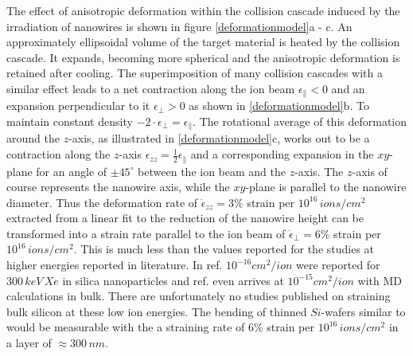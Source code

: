 \documentclass[12pt,
paper=a4,				
DIV=calc,		  %
BCOR=16mm,	  %
headinclude,
openany
]{scrbook}
\begin{document}
The effect of anisotropic deformation within the collision cascade induced by the irradiation of nanowires is shown in figure \ref{deformationmodel}a - c. An approximately ellipsoidal volume of the target material is heated by the collision cascade. It expands, becoming more spherical and the anisotropic deformation is retained after cooling. The superimposition of many collision cascades with a similar effect leads to a net contraction along the ion beam $\epsilon_{\parallel} < 0$ and an expansion perpendicular to it $\epsilon_{\perp} > 0$ as shown in \ref{deformationmodel}b. To maintain constant density $-2\cdot\epsilon_{\perp} =  \epsilon_{\parallel}$. The rotational average of this deformation around the $z$-axis, as illustrated in \ref{deformationmodel}c, works out to be a contraction along the $z$-axis $\epsilon_{zz} = \frac{1}{2} \epsilon_{\parallel}$ and a corresponding expansion in the $xy$-plane for an angle of $\pm 45^\circ$ between the ion beam and the $z$-axis. The $z$-axis of course represents the nanowire axis, while the $xy$-plane is parallel to the nanowire diameter. Thus the deformation rate of $\dot\epsilon_{zz} = 3\%$ strain per $10^{16}\,ions/cm^2$ extracted from a linear fit to the reduction of the nanowire height can be transformed into a strain rate parallel to the ion beam of $\dot\epsilon_{\perp} = 6\%$ strain per $10^{16}\,ions/cm^2$. This is much less than the values reported for the studies at higher energies reported in literature. In ref. \cite{dillen_ion_2003} $10^{-16}cm^2/ion$ were reported for $300\,keV\,Xe$ in silica nanoparticles and ref. \cite{baumer_prediction_2014} even arrives at $10^{-15}cm^2/ion$ with MD calculations in bulk. There are unfortunately no studies published on straining bulk silicon at these low ion energies. The bending of thinned $Si$-wafers similar to \cite{volkert_stress_1991,massl_stress_2008} would be measurable with the a straining rate of $6\%$ strain per $10^{16}\,ions/cm^2$ in a layer of $\approx 300\,nm$.
\end{document}

